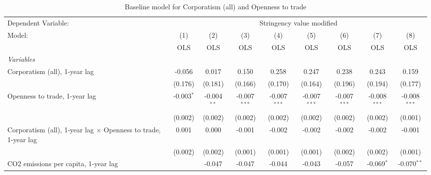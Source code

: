 
\begin{table}[htbp]
   \caption{Baseline model for Corporatism (all) and Openness to trade}
   \centering
   \begin{tabular}{lcccccccc}
      \toprule
      Dependent Variable: & \multicolumn{8}{c}{Stringency value modified}\\
      Model:                                                                & (1)          & (2)           & (3)            & (4)            & (5)            & (6)            & (7)            & (8)\\  
                                                                            &  OLS         & OLS           & OLS            & OLS            & OLS            & OLS            & OLS            & OLS\\  
      \midrule
      \emph{Variables}\\
      Corporatism (all), 1-year lag                                         & -0.056       & 0.017         & 0.150          & 0.258          & 0.247          & 0.238          & 0.243          & 0.159\\   
                                                                            & (0.176)      & (0.181)       & (0.166)        & (0.170)        & (0.164)        & (0.196)        & (0.194)        & (0.177)\\   
      Openness to trade, 1-year lag                                         & -0.003$^{*}$ & -0.004$^{**}$ & -0.007$^{***}$ & -0.007$^{***}$ & -0.007$^{***}$ & -0.007$^{***}$ & -0.008$^{***}$ & -0.008$^{***}$\\   
                                                                            & (0.002)      & (0.002)       & (0.002)        & (0.002)        & (0.002)        & (0.002)        & (0.002)        & (0.001)\\   
      Corporatism (all), 1-year lag $\times$ Openness to trade, 1-year lag  & 0.001        & 0.000         & -0.001         & -0.002         & -0.002         & -0.002         & -0.002         & -0.001\\   
                                                                            & (0.002)      & (0.002)       & (0.001)        & (0.001)        & (0.001)        & (0.002)        & (0.002)        & (0.001)\\   
      CO2 emissions per capita, 1-year lag                                  &              & -0.047        & -0.047         & -0.044         & -0.043         & -0.057         & -0.069$^{*}$   & -0.070$^{**}$\\   

\end{tabular}
\end{table}
